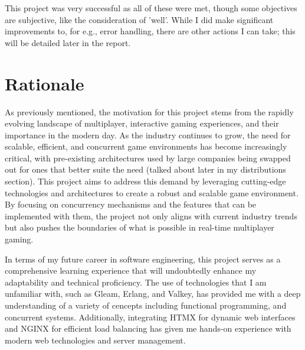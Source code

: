 \documentclass[]{final}
\begin{document}
This project was very successful as all of these were met, though some objectives
are subjective, like the consideration of 'well'. While I did make significant
improvements to, for e.g., error handling, there are other actions I can take;
this will be detailed later in the report.


\section{Rationale}



As previously mentioned, the motivation for this project stems from the
rapidly evolving landscape of multiplayer, interactive gaming experiences,
and their importance in the modern day.
As the industry continues to grow, the need for scalable,
efficient, and concurrent game environments has become increasingly
critical, with pre-existing architectures used by large companies
being swapped out for ones that better suite the need (talked about later in
my distributions section). This project aims to address this demand by leveraging
cutting-edge technologies and architectures
to create a robust and scalable game environment. By focusing on
concurrency mechanisms and the features that can be implemented with them,
the project not only aligns with current industry trends but
also pushes the boundaries of what is possible in real-time
multiplayer gaming.

In terms of my future career in software engineering, this project serves as
a comprehensive learning experience that will undoubtedly enhance my
adaptability and technical proficiency. The use of technologies that I am unfamiliar with,
such as Gleam, Erlang, and Valkey, has provided me with a deep
understanding of a variety of cencepts including functional programming,
and concurrent systems. Additionally, integrating HTMX for dynamic web
interfaces and NGINX for efficient load balancing has given me hands-on
experience with modern web technologies and server management.
\end{document}
